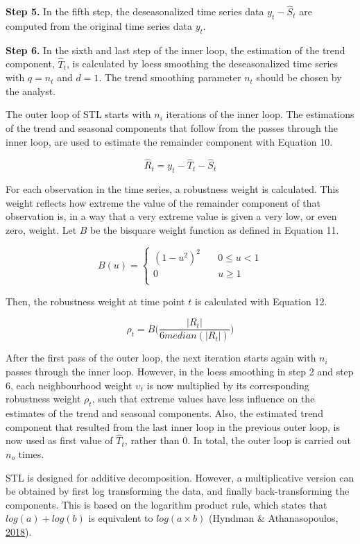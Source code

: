 \documentclass[12pt,oneside]{reedthesis}
\begin{document}
\textbf{Step 5.} In the fifth step, the deseasonalized time series data
\(y_{t} - \hat{S}_{t}\) are computed from the original time series data
\(y_{t}\).

\textbf{Step 6.} In the sixth and last step of the inner loop, the
estimation of the trend component, \(\hat{T}_{t}\), is calculated by
loess smoothing the deseasonalized time series with \(q = n_{t}\) and
\(d = 1\). The trend smoothing parameter \(n_{t}\) should be chosen by
the analyst.

The outer loop of STL starts with \(n_{i}\) iterations of the inner
loop. The estimations of the trend and seasonal components that follow
from the passes through the inner loop, are used to estimate the
remainder component with Equation 10.

\[ \hat{R}_{t} = y_{t} - \hat{T}_{t} - \hat{S}_{t} \]

For each observation in the time series, a robustness weight is
calculated. This weight reflects how extreme the value of the remainder
component of that observation is, in a way that a very extreme value is
given a very low, or even zero, weight. Let \(B\) be the bisquare weight
function as defined in Equation 11.

\[
B(u) = 
    \begin{cases}
      (1 - u^{2})^{2} &\quad 0 \leq u < 1\\
      0 &\quad u \geq 1\\
    \end{cases}
\]

Then, the robustness weight at time point \(t\) is calculated with
Equation 12.

\[ \rho_{t} = B\Bigg(\frac{|R_{t}|}{6median(|R_{t}|)}\Bigg) \]

After the first pass of the outer loop, the next iteration starts again
with \(n_{i}\) passes through the inner loop. However, in the loess
smoothing in step 2 and step 6, each neighbourhood weight
\(\upsilon_{t}\) is now multiplied by its corresponding robustness
weight \(\rho_{t}\), such that extreme values have less influence on the
estimates of the trend and seasonal components. Also, the estimated
trend component that resulted from the last inner loop in the previous
outer loop, is now used as first value of \(\hat{T}_{t}\), rather than
\(0\). In total, the outer loop is carried out \(n_{o}\) times.

STL is designed for additive decomposition. However, a multiplicative
version can be obtained by first log transforming the data, and finally
back-transforming the components. This is based on the logarithm product
rule, which states that \(log(a) + log(b)\) is equivalent to
\(log(a \times b)\) (Hyndman \& Athanasopoulos,
\protect\hyperlink{ref-hyndman2018fpp}{2018}).
\end{document}
